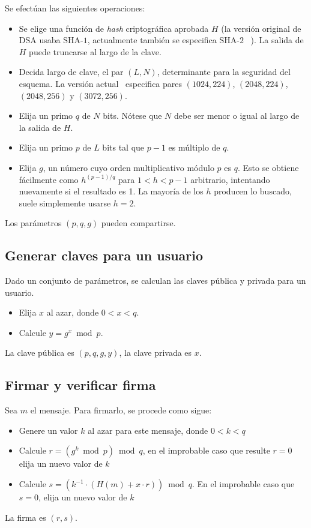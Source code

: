   Se efectúan las siguientes operaciones:
  \begin{itemize}
  \item
    Se elige
    una función
    de \emph{\foreignlanguage{english}{hash}} criptográfica aprobada \(H\)
    (la versión original de DSA usaba SHA\nobreakdash-\(1\),
     actualmente también se especifica SHA\nobreakdash-\(2\)~%
       \cite{FIPS-180-3}).
    La salida de \(H\) puede truncarse al largo de la clave.
  \item
    Decida largo de clave,
    el par \((L, N)\),
    determinante para la seguridad del esquema.
    La versión actual~%
      \cite{FIPS-186-3}
    especifica pares
    \((1024, 224)\), \((2048, 224)\), \((2048, 256)\)
    y \((3072, 256)\).
  \item
    Elija un primo \(q\) de \(N\) bits.
    Nótese que \(N\) debe ser menor o igual
    al largo de la salida de \(H\).
  \item
    Elija un primo \(p\) de \(L\) bits
    tal que \(p - 1\) es múltiplo de \(q\).
  \item
    Elija \(g\),
    un número cuyo orden multiplicativo módulo \(p\) es \(q\).
    Esto se obtiene fácilmente como \(h^{(p - 1) / q}\)
    para \(1 < h < p - 1\) arbitrario,
    intentando nuevamente si el resultado es 1.
    La mayoría de los \(h\) producen lo buscado,
    suele simplemente usarse \(h = 2\).
  \end{itemize}
  Los parámetros \((p, q, g)\) pueden compartirse.

\subsection{Generar claves para un usuario}
\label{sec:DSA-claves}

  Dado un conjunto de parámetros,
  se calculan las claves pública y privada para un usuario.
  \begin{itemize}
  \item
    Elija \(x\) al azar,
    donde \(0 < x < q\).
  \item
    Calcule \(y = g^x \bmod p\).
  \end{itemize}
  La clave pública es \((p, q, g, y)\),
  la clave privada es \(x\).

\subsection{Firmar y verificar firma}
\label{sec:DSA-firmar}

  Sea \(m\) el mensaje.
  Para firmarlo,
  se procede como sigue:
  \begin{itemize}
  \item
    Genere un valor \(k\) al azar para este mensaje,
    donde \(0 < k < q\)
  \item
    Calcule \(r = (g^k \bmod p) \bmod q\),
    en el improbable caso que resulte \(r = 0\)
    elija un nuevo valor de \(k\)
  \item
    Calcule \(s = (k^{-1} \cdot (H(m) + x \cdot r)) \bmod q\).
    En el improbable caso que \(s = 0\),
    elija un nuevo valor de \(k\)
  \end{itemize}
  La firma es \((r, s)\).


